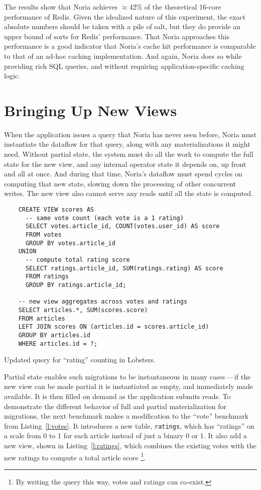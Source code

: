 The results show that Noria achieves $\approx$42\% of the theoretical 16-core
performance of Redis. Given the idealized nature of this experiment, the exact
absolute numbers should be taken with a pile of salt, but they do provide an
upper bound of sorts for Redis' performance. That Noria approaches this
performance is a good indicator that Noria's cache hit performance is comparable
to that of an ad-hoc caching implementation. And again, Noria does so while
providing rich SQL queries, and without requiring application-specific caching
logic.

\section{Bringing Up New Views}
\label{s:eval:mig}

When the application issues a query that Noria has never seen before, Noria must
instantiate the dataflow for that query, along with any materializations it
might need. Without partial state, the system must do all the work to compute
the full state for the new view, and any internal operator state it depends on,
up front and all at once. And during that time, Noria's dataflow must spend
cycles on computing that new state, slowing down the processing of other
concurrent writes. The new view also cannot serve any reads until all the state
is computed.

\begin{listing}[h]
  \begin{verbatim}
    CREATE VIEW scores AS
      -- same vote count (each vote is a 1 rating)
      SELECT votes.article_id, COUNT(votes.user_id) AS score
      FROM votes
      GROUP BY votes.article_id
    UNION
      -- compute total rating score
      SELECT ratings.article_id, SUM(ratings.rating) AS score
      FROM ratings
      GROUP BY ratings.article_id;

    -- new view aggregates across votes and ratings
    SELECT articles.*, SUM(scores.score)
    FROM articles
    LEFT JOIN scores ON (articles.id = scores.article_id)
    GROUP BY articles.id
    WHERE articles.id = ?;
  \end{verbatim}
  \caption{Updated query for ``rating'' counting in Lobsters.}
  \label{l:ratings}
\end{listing}

Partial state enables such migrations to be instantaneous in many cases\,---\,if
the new view can be made partial it is instantiated as empty, and immediately
made available. It is then filled on demand as the application submits reads.
To demonstrate the different behavior of full and partial materialization for
migrations, the next benchmark makes a modification to the ``vote'' benchmark
from Listing~\ref{l:votes}. It introduces a new table, \texttt{ratings}, which
has ``ratings'' on a scale from 0 to 1 for each article instead of just a binary
0 or 1. It also add a new view, shown in Listing~\ref{l:ratings}, which combines
the existing votes with the new ratings to compute a total article score%
\footnote{By writing the query this way, votes and ratings can co-exist.}.

